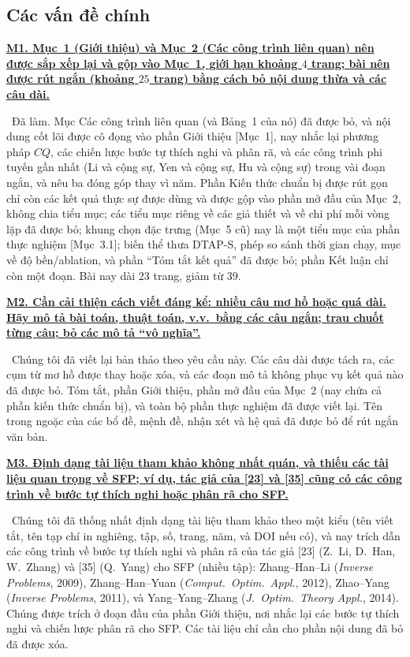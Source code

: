 \documentclass[11pt]{article}
\newcommand{\response}[1]{\smallskip\noindent{\color{blue!60!black}\textbf{Trả lời.}}\ #1\par\medskip}
\newcommand{\loc}[1]{\textcolor{blue!50!black}{[#1]}}
\newenvironment{point}[1]{\medskip\noindent\textbf{\uline{#1}}\par}{\par}
\begin{document}
\subsection*{Các vấn đề chính}

\begin{point}{M1. Mục~1 (Giới thiệu) và Mục~2 (Các công trình liên quan) nên được sắp xếp lại và
gộp vào Mục~1, giới hạn khoảng $4$ trang; bài nên được rút ngắn (khoảng
$25$ trang) bằng cách bỏ nội dung thừa và các câu dài.}
\response{Đã làm. Mục Các công trình liên quan (và Bảng~1 của nó) đã được bỏ, và
nội dung cốt lõi được cô đọng vào phần Giới thiệu \loc{Mục~1}, nay nhắc lại
phương pháp $CQ$, các chiến lược bước tự thích nghi và phân rã, và các công trình phi tuyến
gần nhất (Li và cộng sự, Yen và cộng sự, Hu và cộng sự) trong vài đoạn ngắn, và nêu ba
đóng góp thay vì năm. Phần Kiến thức chuẩn bị được rút gọn chỉ còn các kết quả thực sự được dùng
và được gộp vào phần mở đầu của Mục~2, không chia tiểu mục; các tiểu mục riêng về
các giả thiết và về chi phí mỗi vòng lặp đã được bỏ; khung chọn đặc trưng (Mục~5 cũ) nay là
một tiểu mục của phần thực nghiệm \loc{Mục~3.1}; biến thể thưa DTAP-S, phép so sánh
thời gian chạy, mục về độ bền/ablation, và phần ``Tóm tắt kết quả'' đã được bỏ;
phần Kết luận chỉ còn một đoạn. Bài nay dài $23$ trang, giảm từ $39$.}
\end{point}

\begin{point}{M2. Cần cải thiện cách viết đáng kể: nhiều câu
mơ hồ hoặc quá dài. Hãy mô tả bài toán, thuật toán, v.v.\ bằng các câu ngắn; trau chuốt
từng câu; bỏ các mô tả ``vô nghĩa''.}
\response{Chúng tôi đã viết lại bản thảo theo yêu cầu này. Các câu dài được tách ra,
các cụm từ mơ hồ được thay hoặc xóa, và các đoạn mô tả không phục vụ
kết quả nào đã được bỏ. Tóm tắt, phần Giới thiệu, phần mở đầu của Mục~2 (nay chứa cả phần kiến thức chuẩn bị),
và toàn bộ phần thực nghiệm đã được viết lại. Tên trong ngoặc của các bổ đề,
mệnh đề, nhận xét và hệ quả đã được bỏ để rút ngắn văn bản.}
\end{point}

\begin{point}{M3. Định dạng tài liệu tham khảo không nhất quán, và thiếu các tài liệu quan trọng về
SFP; ví dụ, tác giả của [23] và [35] cũng có các công trình về bước tự thích nghi hoặc phân rã
cho SFP.}
\response{Chúng tôi đã thống nhất định dạng tài liệu tham khảo theo một kiểu (tên viết tắt, tên tạp chí
in nghiêng, tập, số, trang, năm, và DOI nếu có), và nay trích dẫn các công trình
về bước tự thích nghi và phân rã của tác giả [23] (Z.~Li, D.~Han, W.~Zhang) và
[35] (Q.~Yang) cho SFP (nhiều tập): Zhang--Han--Li (\emph{Inverse Problems}, 2009),
Zhang--Han--Yuan (\emph{Comput.\ Optim.\ Appl.}, 2012), Zhao--Yang (\emph{Inverse
Problems}, 2011), và Yang--Yang--Zhang (\emph{J.\ Optim.\ Theory Appl.}, 2014). Chúng được
trích ở đoạn đầu của phần Giới thiệu, nơi nhắc lại các bước tự thích nghi và
chiến lược phân rã cho SFP. Các tài liệu chỉ cần cho phần nội dung đã bỏ
đã được xóa.}
\end{point}
\end{document}
